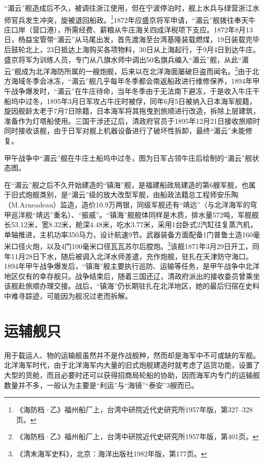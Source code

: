 \documentclass[12pt,UTF8]{ctexbook}
\begin{document}
“湄云”舰造成后不久，被调往浙江使用，但在宁波停泊时，舰上水兵与绿营浙江水师官兵发生冲突，旋被退回船政。\footnote{《海防档·乙》福州船厂上，台湾中研院近代史研究所1957年版，第327--328页。}1872年应盛京将军申请，“湄云”舰拨往奉天牛庄口岸（营口港），所需经费、薪粮从牛庄海关四成洋税项下支应。1872年8月13日，杨益宝管带“湄云”从马尾出发，首先渡海至台湾基隆装载燃煤，19日装载完毕后鼓轮北上，23日抵达上海购买各项物料，30日从上海起行，于9月4日到达牛庄。盛京将军为训练人员，专门从八旗水师中调出50名旗兵编入“湄云”舰，从此“湄云”舰成为北洋海防所属的一艘炮舰，后来以在北洋海面屡破巨盗而闻名。\footnote{《海防档·乙》福州船厂上，台湾中研院近代史研究所1957年版，第401页。}由于北方海域冬季会冰冻，“湄云”舰几乎每年冬季都会南返船政进行维修保养，1894年甲午战争爆发时，“湄云”在牛庄待命，当年冬季由于无法南下避冻，于是收入牛庄干船坞中过冬，1895年3月日军攻占牛庄时被俘，同年6月5日被纳入日本海军舰籍，旋因舰龄太老于7月7日除籍，日本海军将其拖曳到旅顺进行改造，拆除上层建筑，准备作为灯塔船使用。三国干涉还辽后，清政府官员于1895年12月21日接收旅顺时同时接收该舰，由于日军对舰上机器设备进行了破坏性拆卸，最终“湄云”未能修复。

甲午战争中“湄云”舰在牛庄土船坞中过冬，图为日军占领牛庄后绘制的“湄云”舰状态图。

在“湄云”舰之后不久开始建造的“镇海”舰，是福建船政局建造的第6艘军舰，也属于旧式炮舰类别，是“湄云”级的放大改型军舰，由船政法籍总工程师安乐陶（M.Arneadeau）监造，造价10.9万两银，同级军舰还有“靖远”（与北洋海军的穹甲巡洋舰“靖远”重名）、“振威”。“镇海”舰舰体同样是木质，排水量572吨，军舰舰长53.12米，宽8.32米，舱深4.48米，吃水3.77米，采用1台卧式2汽缸往复蒸汽机，单轴推进，主机功率350马力，设计航速9节。武器装备方面配备1门普鲁士造160毫米口径火炮，以及4门100毫米口径瓦瓦苏尔后膛炮。\footnote{《清末海军史料》，北京：海洋出版社1982年版，第177页。}该舰1871年3月29日开工，同年11月28日下水，随后被调入北洋水师差遣，充作炮舰，驻扎在天津防守海口。1894年甲午战争爆发后，“镇海”舰主要执行巡防、运输等任务，是甲午战争中北洋地区仅有的幸存舰只。战争结束后，随着三国还辽，清政府派出的接收委员曾乘坐该舰赴旅顺办理交接。战后，“镇海”仍长期驻扎在北洋地区，她的最后归宿在史料中难寻踪迹，可能因为舰况过老而拆解。

\section{运辅舰只}

用于载运人、物的运输舰虽然并不是作战舰种，然而却是海军中不可或缺的军舰。北洋海军时代，由于北洋海军内大量的旧式炮舰建造时就考虑了运货功能，设置了大型的货舱，而且必要时还可以获得招商局轮船的协助，因而海军内专门的运输舰数量并不多，一般认为主要是“利运”与“海镜”“泰安”3艘而已。
\end{document}
